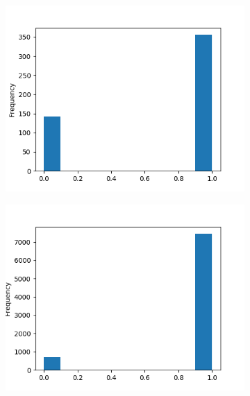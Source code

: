 \documentclass[a4paper]{article}
\begin{document}
\begin{figure}[!ht]
        \vspace{5mm}

        \begin{subfigure}[!ht]{.5\linewidth}
            \label{fig:proba-true}
            \centering
            \includegraphics[width=\textwidth]{./img/proba-true.png}
        \end{subfigure}
        \begin{subfigure}[!ht]{.5\linewidth}
            \centering
            \includegraphics[width=\textwidth]{./img/orig-true.png}
        \end{subfigure}
    \end{figure}
\end{document}
